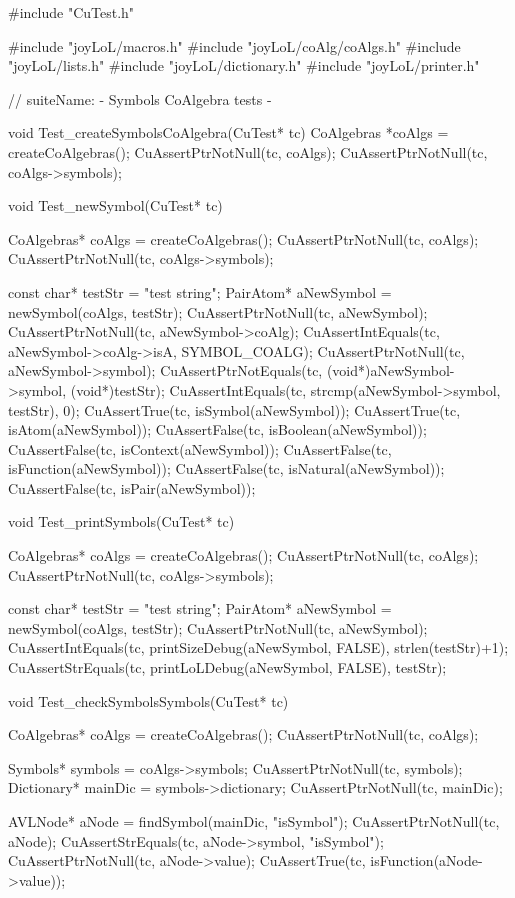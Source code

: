 #include "CuTest.h"

#include "joyLoL/macros.h"
#include "joyLoL/coAlg/coAlgs.h"
#include "joyLoL/lists.h"
#include "joyLoL/dictionary.h"
#include "joyLoL/printer.h"

// suiteName: - Symbols CoAlgebra tests -

void Test_createSymbolsCoAlgebra(CuTest* tc) {
  CoAlgebras *coAlgs = createCoAlgebras();
  CuAssertPtrNotNull(tc, coAlgs);
  CuAssertPtrNotNull(tc, coAlgs->symbols);
}

void Test_newSymbol(CuTest* tc) {
  CoAlgebras* coAlgs = createCoAlgebras();
  CuAssertPtrNotNull(tc, coAlgs);
  CuAssertPtrNotNull(tc, coAlgs->symbols);

  const char* testStr = "test string";
  PairAtom* aNewSymbol = newSymbol(coAlgs, testStr);
  CuAssertPtrNotNull(tc, aNewSymbol);
  CuAssertPtrNotNull(tc, aNewSymbol->coAlg);
  CuAssertIntEquals(tc, aNewSymbol->coAlg->isA, SYMBOL_COALG);
  CuAssertPtrNotNull(tc, aNewSymbol->symbol);
  CuAssertPtrNotEquals(tc, (void*)aNewSymbol->symbol, (void*)testStr);
  CuAssertIntEquals(tc, strcmp(aNewSymbol->symbol, testStr), 0);
  CuAssertTrue(tc, isSymbol(aNewSymbol));
  CuAssertTrue(tc, isAtom(aNewSymbol));
  CuAssertFalse(tc, isBoolean(aNewSymbol));
  CuAssertFalse(tc, isContext(aNewSymbol));
  CuAssertFalse(tc, isFunction(aNewSymbol));
  CuAssertFalse(tc, isNatural(aNewSymbol));
  CuAssertFalse(tc, isPair(aNewSymbol));
}

void Test_printSymbols(CuTest* tc) {
  CoAlgebras* coAlgs = createCoAlgebras();
  CuAssertPtrNotNull(tc, coAlgs);
  CuAssertPtrNotNull(tc, coAlgs->symbols);

  const char* testStr = "test string";
  PairAtom* aNewSymbol = newSymbol(coAlgs, testStr);
  CuAssertPtrNotNull(tc, aNewSymbol);
  CuAssertIntEquals(tc, printSizeDebug(aNewSymbol, FALSE), strlen(testStr)+1);
  CuAssertStrEquals(tc, printLoLDebug(aNewSymbol, FALSE), testStr);
}

void Test_checkSymbolsSymbols(CuTest* tc) {
  CoAlgebras* coAlgs = createCoAlgebras();
  CuAssertPtrNotNull(tc, coAlgs);

  Symbols* symbols = coAlgs->symbols;
  CuAssertPtrNotNull(tc, symbols);
  Dictionary* mainDic = symbols->dictionary;
  CuAssertPtrNotNull(tc, mainDic);

  AVLNode* aNode = findSymbol(mainDic, "isSymbol");
  CuAssertPtrNotNull(tc, aNode);
  CuAssertStrEquals(tc, aNode->symbol, "isSymbol");
  CuAssertPtrNotNull(tc, aNode->value);
  CuAssertTrue(tc, isFunction(aNode->value));
}
\stoptyping